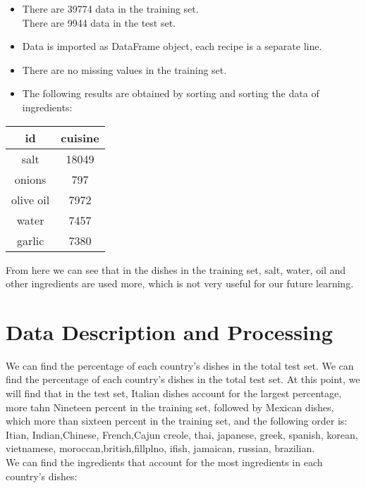 \begin{itemize}
  \item
  There are 39774 data in the training set.\\
  There are 9944 data in the test set.\\   

  \item
  Data is imported as DataFrame object, each recipe is a separate line.\\  
  \item  There are no missing values in the training set.\\
  \item The following results are obtained by sorting and sorting the data of ingredients:

\end{itemize}
\begin{center}
\vspace{.5cm}
  \begin{tabular}{ c | c }
    \toprule
    id & cuisine      \\
    \midrule
    salt & 18049  \\
   onions	& 797 \\
    olive oil	& 7972 \\
    water	& 7457\\
    garlic	& 7380\\
     \bottomrule
\end{tabular}
\end{center}
\text
From here we can see that in the dishes in the training set, 
salt, water, oil and other ingredients are used more, which 
is not very useful for our future learning.

\section{Data Description and Processing} \label{sec-conclusions}
\text
We can find the percentage of each country’s dishes in the total test set.
We can find the percentage of each country’s dishes in the total test set. 
At this point, we will find that in the test set, Italian dishes account for 
the largest percentage, more tahn Nineteen percent in the training set, 
followed by Mexican dishes, which more than sixteen percent in the training set, 
and the following order is: \\
Itian, Indian,Chinese, French,Cajun creole, thai, 
japanese, greek, spanish, korean, vietnamese, moroccan,british,fillplno, ifish, jamaican,
russian, brazilian.\\
We can find the ingredients that account for the most ingredients in each country’s dishes:\\

